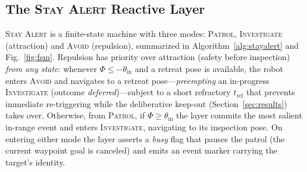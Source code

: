 \subsection{The \textsc{Stay Alert} Reactive Layer}
\label{sec:method-stayalert}
\textsc{Stay Alert} is a finite-state machine with three modes:
\textsc{Patrol}, \textsc{Investigate} (attraction) and \textsc{Avoid}
(repulsion), summarized in Algorithm~\ref{alg:stayalert} and
Fig.~\ref{fig:fsm}. Repulsion has priority over attraction (safety before
inspection) \emph{from any state}: whenever $\Phi \le -\theta_{\text{in}}$ and a
retreat pose is available, the robot enters \textsc{Avoid} and navigates to a
retreat pose---\emph{preempting} an in-progress \textsc{Investigate} (outcome
\emph{deferred})---subject to a short refractory $t_{\text{ref}}$ that prevents
immediate re-triggering while the deliberative keep-out (Section~\ref{sec:results})
takes over. Otherwise, from \textsc{Patrol}, if $\Phi \ge \theta_{\text{in}}$ the
layer commits the most salient in-range event and enters \textsc{Investigate},
navigating to its inspection pose. On entering either mode the layer asserts a
\emph{busy} flag that pauses the patrol (the current waypoint goal is canceled)
and emits an event marker carrying the target's identity.

